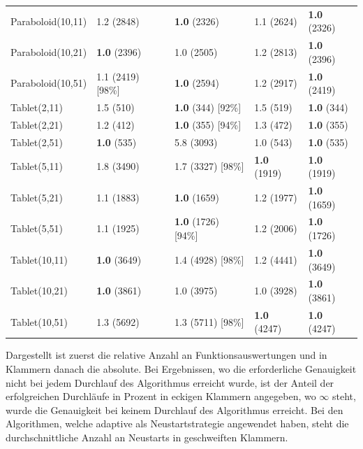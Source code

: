 \documentclass[fontsize=12, a4aper]{scrartcl}
\begin{document}
\begin{table}[H]
\begin{tabularx}{\linewidth}{X X X X X}
			Paraboloid(10,11) & 1.2 (2848) & \textbf{1.0} (2326) & 1.1 (2624) & \textbf{1.0} (2326)\\
			
			Paraboloid(10,21) & \textbf{1.0} (2396) & 1.0 (2505) & 1.2 (2813) & \textbf{1.0} (2396)\\
			
			Paraboloid(10,51) & 1.1 (2419) [98\%] & \textbf{1.0} (2594) & 1.2 (2917) & \textbf{1.0} (2419)\\
			
			Tablet(2,11) & 1.5 (510) & \textbf{1.0} (344) [92\%] & 1.5 (519) & \textbf{1.0} (344)\\
			
			Tablet(2,21) & 1.2 (412) & \textbf{1.0} (355) [94\%] & 1.3 (472) & \textbf{1.0} (355)\\
			
			Tablet(2,51) & \textbf{1.0} (535) & 5.8 (3093) & 1.0 (543) & \textbf{1.0} (535)\\
			
			Tablet(5,11) & 1.8 (3490) & 1.7 (3327) [98\%] & \textbf{1.0} (1919) & \textbf{1.0} (1919)\\
			
			Tablet(5,21) & 1.1 (1883) & \textbf{1.0} (1659) & 1.2 (1977) & \textbf{1.0} (1659)\\
			
			Tablet(5,51) & 1.1 (1925) & \textbf{1.0} (1726) [94\%] & 1.2 (2006) & \textbf{1.0} (1726)\\
			
			Tablet(10,11) & \textbf{1.0} (3649) & 1.4 (4928) [98\%] & 1.2 (4441) & \textbf{1.0} (3649)\\
			
			Tablet(10,21) & \textbf{1.0} (3861) & 1.0 (3975) & 1.0 (3928) & \textbf{1.0} (3861)\\
			
			Tablet(10,51) & 1.3 (5692) & 1.3 (5711) [98\%] & \textbf{1.0} (4247) & \textbf{1.0} (4247)\\
			
			\bottomrule
			
		\end{tabularx}
		
		\smallskip
		
		Dargestellt ist zuerst die relative Anzahl an Funktionsauswertungen und in Klammern danach die absolute. Bei Ergebnissen, wo die erforderliche Genauigkeit nicht bei jedem Durchlauf des Algorithmus erreicht wurde, ist der Anteil der erfolgreichen Durchläufe in Prozent in eckigen Klammern angegeben, wo \(\infty\) steht, wurde die Genauigkeit bei keinem Durchlauf des Algorithmus erreicht. Bei den Algorithmen, welche \glqq adaptive\grqq{} als Neustartstrategie angewendet haben, steht die durchschnittliche Anzahl an Neustarts in geschweiften Klammern.
		
	\end{table}
	
\end{document}
